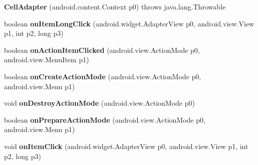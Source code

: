 \begin{DoxyCompactItemize}
\item 
\mbox{\label{classmd5b60ffeb829f638581ab2bb9b1a7f4f3f_1_1_cell_adapter_acc33c5de6c2168e85cfed4b8b631a7f7}} 
{\bfseries Cell\+Adapter} (android.\+content.\+Context p0)  throws java.\+lang.\+Throwable 	
\item 
\mbox{\label{classmd5b60ffeb829f638581ab2bb9b1a7f4f3f_1_1_cell_adapter_a6315b61158f9e22013a511c7edd6bcdc}} 
boolean {\bfseries on\+Item\+Long\+Click} (android.\+widget.\+Adapter\+View p0, android.\+view.\+View p1, int p2, long p3)
\item 
\mbox{\label{classmd5b60ffeb829f638581ab2bb9b1a7f4f3f_1_1_cell_adapter_a1febf1cc030736547768ae04d9ae8a8b}} 
boolean {\bfseries on\+Action\+Item\+Clicked} (android.\+view.\+Action\+Mode p0, android.\+view.\+Menu\+Item p1)
\item 
\mbox{\label{classmd5b60ffeb829f638581ab2bb9b1a7f4f3f_1_1_cell_adapter_a4a8ad9014d454fbe0396726ba6b20b4b}} 
boolean {\bfseries on\+Create\+Action\+Mode} (android.\+view.\+Action\+Mode p0, android.\+view.\+Menu p1)
\item 
\mbox{\label{classmd5b60ffeb829f638581ab2bb9b1a7f4f3f_1_1_cell_adapter_a2c4b1f2ec74b292e21fd9c665ba8ee1d}} 
void {\bfseries on\+Destroy\+Action\+Mode} (android.\+view.\+Action\+Mode p0)
\item 
\mbox{\label{classmd5b60ffeb829f638581ab2bb9b1a7f4f3f_1_1_cell_adapter_a51d520fe6621a42e3dc8c690d1e763c0}} 
boolean {\bfseries on\+Prepare\+Action\+Mode} (android.\+view.\+Action\+Mode p0, android.\+view.\+Menu p1)
\item 
\mbox{\label{classmd5b60ffeb829f638581ab2bb9b1a7f4f3f_1_1_cell_adapter_abe81186ab9094ff7ddd3f969e015a2e2}} 
void {\bfseries on\+Item\+Click} (android.\+widget.\+Adapter\+View p0, android.\+view.\+View p1, int p2, long p3)

\end{DoxyCompactItemize}
